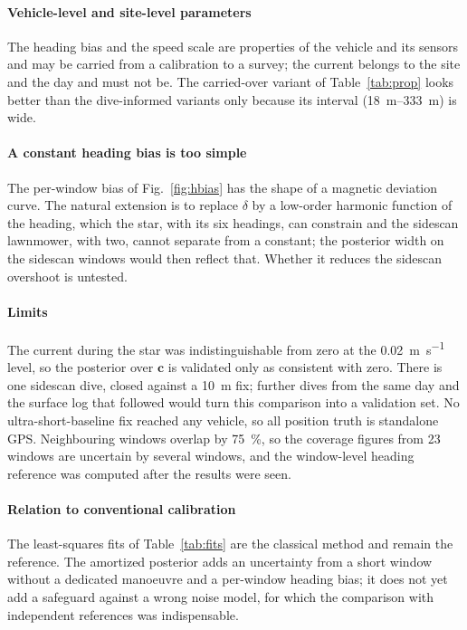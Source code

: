 \documentclass[conference]{IEEEtran}
\newcommand{\vect}[1]{\boldsymbol{#1}}
\begin{document}
\paragraph{Vehicle-level and site-level parameters} The heading bias and the speed scale are properties of the vehicle and its sensors and may be carried from a calibration to a survey; the current belongs to the site and the day and must not be. The carried-over variant of Table~\ref{tab:prop} looks better than the dive-informed variants only because its interval (\SIrange{18}{333}{\meter}) is wide.

\paragraph{A constant heading bias is too simple} The per-window bias of Fig.~\ref{fig:hbias} has the shape of a magnetic deviation curve. The natural extension is to replace $\delta$ by a low-order harmonic function of the heading, which the star, with its six headings, can constrain and the sidescan lawnmower, with two, cannot separate from a constant; the posterior width on the sidescan windows would then reflect that. Whether it reduces the sidescan overshoot is untested.

\paragraph{Limits} The current during the star was indistinguishable from zero at the \SI{0.02}{\meter\per\second} level, so the posterior over $\vect{c}$ is validated only as consistent with zero. There is one sidescan dive, closed against a \SI{10}{\meter} fix; further dives from the same day and the surface log that followed would turn this comparison into a validation set. No ultra-short-baseline fix reached any vehicle, so all position truth is standalone GPS. Neighbouring windows overlap by \SI{75}{\percent}, so the coverage figures from 23 windows are uncertain by several windows, and the window-level heading reference was computed after the results were seen.

\paragraph{Relation to conventional calibration} The least-squares fits of Table~\ref{tab:fits} are the classical method \cite{kinsey2007alignment} and remain the reference. The amortized posterior adds an uncertainty from a short window without a dedicated manoeuvre and a per-window heading bias; it does not yet add a safeguard against a wrong noise model, for which the comparison with independent references was indispensable.
\end{document}

